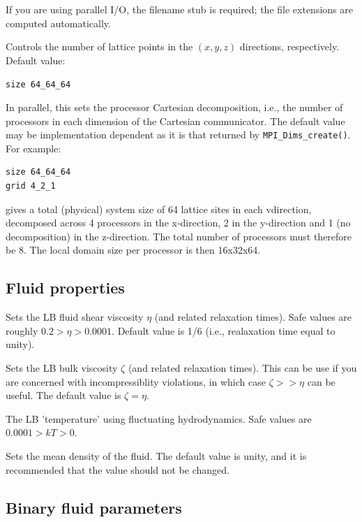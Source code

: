 If you are using parallel I/O, the filename stub is required; the
file extensions are computed automatically.


Controls the number of lattice points in the $(x, y, z)$ directions,
respectively. Default value:

\texttt{size 64\_64\_64}


In parallel, this sets the processor Cartesian decomposition, i.e.,
the number of processors in each dimension of the Cartesian communicator.
The default value may be implementation dependent as it is that returned
by \texttt{MPI\_Dims\_create()}. For
example:
\begin{verbatim}
size 64_64_64
grid 4_2_1
\end{verbatim}
gives a total (physical) system size of 64 lattice sites in each
vdirection, decomposed across 4 processors in the x-direction, 2 in
the y-direction and 1 (no decomposition) in the z-direction. The
total number of processors must therefore be 8. The local domain
size per processor is then 16x32x64.


\subsection{Fluid properties}


Sets the LB fluid shear viscosity $\eta$ (and related relaxation times).
Safe values are roughly $0.2 > \eta > 0.0001 $. Default value is 1/6
(i.e., realaxation time equal to unity).


Sets the LB bulk viscosity $\zeta$ (and related relaxation times).
This can be use if you are concerned with incompressiblity
violations, in which case $\zeta >> \eta$ can be useful. The
default value is $\zeta = \eta$.


The LB 'temperature' using fluctuating hydrodynamics. Safe values
are $0.0001 > kT > 0$. 


Sets the mean density of the fluid. The default value is unity, and
it is recommended that the value should not be changed.



\subsection{Binary fluid parameters}

